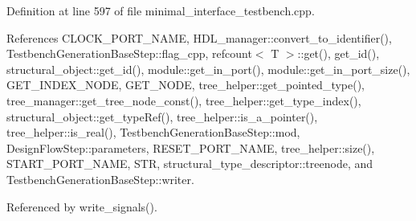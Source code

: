 Definition at line 597 of file minimal\+\_\+interface\+\_\+testbench.\+cpp.



References C\+L\+O\+C\+K\+\_\+\+P\+O\+R\+T\+\_\+\+N\+A\+ME, H\+D\+L\+\_\+manager\+::convert\+\_\+to\+\_\+identifier(), Testbench\+Generation\+Base\+Step\+::flag\+\_\+cpp, refcount$<$ T $>$\+::get(), get\+\_\+id(), structural\+\_\+object\+::get\+\_\+id(), module\+::get\+\_\+in\+\_\+port(), module\+::get\+\_\+in\+\_\+port\+\_\+size(), G\+E\+T\+\_\+\+I\+N\+D\+E\+X\+\_\+\+N\+O\+DE, G\+E\+T\+\_\+\+N\+O\+DE, tree\+\_\+helper\+::get\+\_\+pointed\+\_\+type(), tree\+\_\+manager\+::get\+\_\+tree\+\_\+node\+\_\+const(), tree\+\_\+helper\+::get\+\_\+type\+\_\+index(), structural\+\_\+object\+::get\+\_\+type\+Ref(), tree\+\_\+helper\+::is\+\_\+a\+\_\+pointer(), tree\+\_\+helper\+::is\+\_\+real(), Testbench\+Generation\+Base\+Step\+::mod, Design\+Flow\+Step\+::parameters, R\+E\+S\+E\+T\+\_\+\+P\+O\+R\+T\+\_\+\+N\+A\+ME, tree\+\_\+helper\+::size(), S\+T\+A\+R\+T\+\_\+\+P\+O\+R\+T\+\_\+\+N\+A\+ME, S\+TR, structural\+\_\+type\+\_\+descriptor\+::treenode, and Testbench\+Generation\+Base\+Step\+::writer.



Referenced by write\+\_\+signals().

